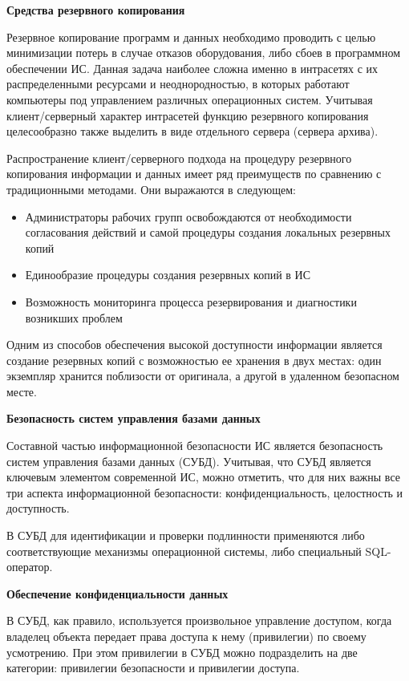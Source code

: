 \bigbreak
\textbf{Средства резервного копирования}

Резервное копирование программ и данных необходимо проводить с целью минимизации потерь в случае отказов
оборудования, либо сбоев в программном обеспечении ИС. Данная задача наиболее сложна именно в интрасетях
с их распределенными ресурсами и неоднородностью, в которых работают компьютеры под управлением различных
операционных систем. Учитывая клиент/серверный характер интрасетей функцию резервного копирования целесообразно
также выделить в виде отдельного сервера (сервера архива).

Распространение клиент/серверного подхода на процедуру резервного копирования информации и данных
имеет ряд преимуществ по сравнению с традиционными методами. Они выражаются в следующем:
\begin{itemize}
    \item Администраторы рабочих групп освобождаются от необходимости согласования действий
    и самой процедуры создания локальных резервных копий
    \item Единообразие процедуры создания резервных копий в ИС
    \item Возможность мониторинга процесса резервирования и диагностики возникших проблем
\end{itemize}

Одним из способов обеспечения высокой доступности информации является создание резервных копий с возможностью
ее хранения в двух местах: один экземпляр хранится поблизости от оригинала, а другой в удаленном безопасном месте.

\bigbreak
\textbf{Безопасность систем управления базами данных}

Составной частью информационной безопасности ИС является безопасность систем управления
базами данных (СУБД). Учитывая, что СУБД является ключевым элементом современной ИС, можно отметить, что
для них важны все три аспекта информационной безопасности: конфиденциальность, целостность и доступность.

В СУБД для идентификации и проверки подлинности применяются либо соответствующие механизмы операционной
системы, либо специальный SQL-оператор.

\bigbreak
\textbf{Обеспечение конфиденциальности данных}

В СУБД, как правило, используется произвольное управление доступом, когда владелец объекта передает
права доступа к нему (привилегии) по своему усмотрению. При этом привилегии в СУБД можно подразделить на две
категории: привилегии безопасности и привилегии доступа.

